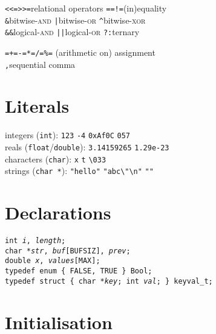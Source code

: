\documentclass[8pt]{article}
\newcommand{\Cc}[1]{\texttt{#1}}
\newcommand{\kw}[1]{\textcolor{black!40!lime}{\texttt{#1}}} %
\newcommand{\ty}[1]{\textcolor{blue!80}{\texttt{#1}}} %
\newcommand{\kv}[1]{\textcolor{red!40!black}{\texttt{#1}}} %
\newcommand{\val}[1]{\texttt{#1}} %
\newcommand{\quo}[1]{\textcolor{violet!80!black}{\texttt{#1}}} %
\newcommand{\quot}[1]{\quo{"#1"}} %
\newcommand{\fn}[1]{\texttt{#1}} %
\newcommand{\var}[1]{\texttt{\textit{#1}}} %
\newcommand{\opt}[1]{\textrm{\textit{#1}}} %
\newcommand{\Cq}{\textquotesingle} %
\newcommand{\Cx}{\textbackslash} %
\begin{document}
\begin{multicols}{3}
\Cc{<}\quad\Cc{<=}\quad\Cc{>}\quad\Cc{>=}\quad relational operators \hfill
\Cc{==}\quad\Cc{!=}\quad (in)equality \\
\Cc{\&}\quad bitwise-\textsc{and} \hfill
\Cc{|}\quad bitwise-\textsc{or} \hfill
\Cc{\^}\quad bitwise-\textsc{xor} \\
\Cc{\&\&}\quad logical-\textsc{and} \hfill
\Cc{||}\quad logical-\textsc{or} \hfill 
\Cc{?:}\quad ternary

\Cc{=}\quad\Cc{+=}\quad\Cc{-=}\quad\Cc{*=}\quad\Cc{/=}\quad\Cc{\%=} \hfill
    (arithmetic on) assignment \\
\Cc{,}\quad sequential comma

\section*{Literals}

integers (\ty{int}):\hfill
    \val{123}\quad
    \val{-4}\quad 
    \val{0xAf0C}\quad 
    \val{057}\\
reals (\ty{float}/\ty{double}):\hfill
    \val{3.14159265}\quad
    \val{1.29e-23}\\
characters (\ty{char}):\hfill
    \val{\Cq x\Cq}\quad
    \val{\Cq t\Cq}
    \val{\Cq\Cx033\Cq}\\
strings (\ty{char *}):\hfill
    \quot{hello}\quad
    \quot{abc\Cx"\Cx n}\quad
    \quot{}


\section*{Declarations}

\Cc{\ty{int} \var{i}, \var{length}; \\
\ty{char *}\var{str}, \var{buf}[\kv{BUFSIZ}], \var{prev}; \\
\ty{double} \var{x}, \var{values}[\kv{MAX}]; \\
\kw{typedef} \ty{enum} \{ \kv{FALSE}, \kv{TRUE} \} \ty{Bool}; \\
\kw{typedef} \ty{struct} \{ \ty{char *}\var{key}; \ty{int} \var{val}; \} \ty{keyval\_t};}

\section*{Initialisation}


\end{multicols}
\end{document}
